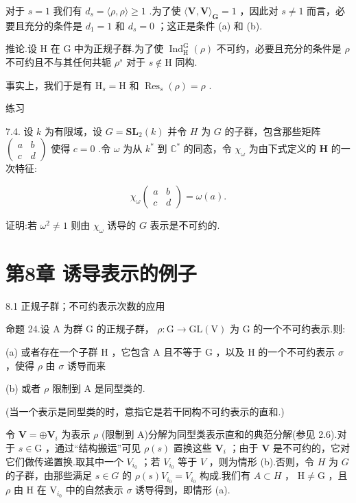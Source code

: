 \documentclass[10pt]{article}
\begin{document}
对于 \(s = 1\) 我们有 \({d}_{s} = \langle \rho ,\rho \rangle  \geq  1\) .为了使 \(\langle \mathbf{V},\mathbf{V}{\rangle }_{\mathbf{G}} = 1\) ，因此对 \(s \neq  1\) 而言，必要且充分的条件是 \({d}_{1} = 1\) 和 \({d}_{s} = 0\) ；这正是条件 (a) 和 (b).

推论.设 \(\mathrm{H}\) 在 \(\mathrm{G}\) 中为正规子群.为了使 \({\operatorname{Ind}}_{\mathrm{H}}^{\mathrm{G}}\left( \rho \right)\) 不可约，必要且充分的条件是 \(\rho\) 不可约且不与其任何共轭 \({\rho }^{s}\) 对于 \(s \notin  \mathrm{H}\) 同构.

事实上，我们于是有 \({\mathrm{H}}_{s} = \mathrm{H}\) 和 \({\operatorname{Res}}_{s}\left( \rho \right)  = \rho\) .

练习

7.4. 设 \(k\) 为有限域，设 \(G = {\mathbf{{SL}}}_{2}\left( k\right)\) 并令 \(H\) 为 \(G\) 的子群，包含那些矩阵 \(\left( \begin{array}{ll} a & b \\  c & d \end{array}\right)\) 使得 \(c = 0\) .令 \(\omega\) 为从 \({k}^{ * }\) 到 \({\mathbb{C}}^{ * }\) 的同态，令 \({\chi }_{\omega }\) 为由下式定义的 \(\mathbf{H}\) 的一次特征:

\[
{\chi }_{\omega }\left( \begin{array}{ll} a & b \\  c & d \end{array}\right)  = \omega \left( a\right) .
\]

证明:若 \({\omega }^{2} \neq  1\) 则由 \({\chi }_{\omega }\) 诱导的 \(G\) 表示是不可约的.

\section*{第8章 诱导表示的例子}

8.1 正规子群；不可约表示次数的应用

命题 24.设 A 为群 G 的正规子群， \(\rho  : \mathrm{G} \rightarrow  \mathrm{{GL}}\left( \mathrm{V}\right)\) 为 \(\mathrm{G}\) 的一个不可约表示.则:

(a) 或者存在一个子群 \(\mathrm{H}\) ，它包含 A 且不等于 \(\mathrm{G}\) ，以及 \(\mathrm{H}\) 的一个不可约表示 \(\sigma\) ，使得 \(\rho\) 由 \(\sigma\) 诱导而来

(b) 或者 \(\rho\) 限制到 \(\mathrm{A}\) 是同型类的.

(当一个表示是同型类的时，意指它是若干同构不可约表示的直和.)

令 \(\mathbf{V} =  \oplus  {\mathbf{V}}_{i}\) 为表示 \(\rho\) (限制到 A)分解为同型类表示直和的典范分解(参见 2.6).对于 \(s \in  \mathrm{G}\) ，通过“结构搬运”可见 \(\rho \left( s\right)\) 置换这些 \({\mathbf{V}}_{i}\) ；由于 \(\mathbf{V}\) 是不可约的，它对它们做传递置换.取其中一个 \({V}_{{i}_{0}}\) ；若 \({V}_{{i}_{0}}\) 等于 \(V\) ，则为情形 (b).否则，令 \(H\) 为 \(G\) 的子群，由那些满足 \(s \in  G\) 的 \(\rho \left( s\right) {V}_{{i}_{0}} = {V}_{{i}_{0}}\) 构成.我们有 \(A \subset  H\) ， \(\mathrm{H} \neq  \mathrm{G}\) ，且 \(\rho\) 由 \(\mathrm{H}\) 在 \({\mathrm{V}}_{{i}_{0}}\) 中的自然表示 \(\sigma\) 诱导得到，即情形 (a).
\end{document}
